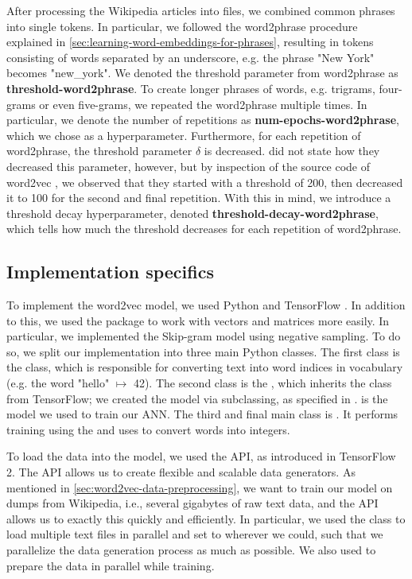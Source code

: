 After processing the Wikipedia articles into files, we combined common phrases into single tokens. In particular, we followed the word2phrase procedure explained in \cref{sec:learning-word-embeddings-for-phrases}, resulting in tokens consisting of words separated by an underscore, e.g. the phrase "New York" becomes "new\_york". We denoted the threshold parameter from word2phrase as \textbf{threshold-word2phrase}. To create longer phrases of words, e.g. trigrams, four-grams or even five-grams, we repeated the word2phrase multiple times. In particular, we denote the number of repetitions as \textbf{num-epochs-word2phrase}, which we chose as a hyperparameter. Furthermore, for each repetition of word2phrase, the threshold parameter $\delta$ is decreased. \cite{mikolov2013b} did not state how they decreased this parameter, however, but by inspection of the source code of word2vec \cite{Word2vecDemoPhrasesCode}, we observed that they started with a threshold of 200, then decreased it to 100 for the second and final repetition. With this in mind, we introduce a threshold decay hyperparameter, denoted \textbf{threshold-decay-word2phrase}, which tells how much the threshold decreases for each repetition of word2phrase.

\subsection{Implementation specifics}
\label{sec:word2vec-impl-specifics}
To implement the word2vec model, we used Python and TensorFlow \cite{tensorflow2015-whitepaper}. In addition to this, we used the  \cite{2020NumPy-Array} package to work with vectors and matrices more easily. In particular, we implemented the Skip-gram model using negative sampling. To do so, we split our implementation into three main Python classes. The first class is the  class, which is responsible for converting text into word indices in vocabulary (e.g. the word "hello" $\mapsto$ 42). The second class is the , which inherits the  class from TensorFlow; we created the model via subclassing, as specified in \cite{TensorflowSubclassing2020}.  is the model we used to train our ANN. The third and final main class is . It performs training using the  and uses  to convert words into integers.

To load the data into the model, we used the  API, as introduced in TensorFlow 2. The  API allows us to create flexible and scalable data generators. As mentioned in \cref{sec:word2vec-data-preprocessing}, we want to train our model on dumps from Wikipedia, i.e., several gigabytes of raw text data, and the  API allows us to exactly this quickly and efficiently. In particular, we used the  class to load multiple text files in parallel and set  to  wherever we could, such that we parallelize the data generation process as much as possible. We also used  to prepare the data in parallel while training.

